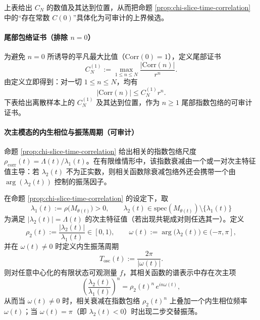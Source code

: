 
上表给出 $C_N$ 的数值及其达到位置，从而把命题 \ref{prop:chi-slice-time-correlation} 中的“存在常数 $C(0)$”具体化为可审计的上界候选。

\paragraph{尾部包络证书（排除 $n=0$）}
为避免 $n=0$ 所诱导的平凡最大比值（$\mathrm{Corr}(0)=1$），定义尾部证书
\[
C_N^{(1)}:=\max_{1\le n\le N}\frac{|\mathrm{Corr}(n)|}{r^n}.
\]
由定义立即得到：对一切 $1\le n\le N$，均有
\[
|\mathrm{Corr}(n)|\le C_N^{(1)} r^n.
\]
下表给出离散样本上的 $C_N^{(1)}$ 及其达到位置，作为 $n\ge 1$ 尾部指数包络的可审计证书。


\paragraph{次主模态的内生相位与振荡周期（可审计）}
命题 \ref{prop:chi-slice-time-correlation} 给出相关的指数包络尺度 $\rho_{\mathrm{corr}}(t)=\Lambda(t)/\lambda_1(t)$。在有限维情形中，该指数衰减由一个或一对次主特征值主导：若 $\lambda_2(t)$ 不为正实数，则相关函数除衰减包络外还会携带一个由 $\arg(\lambda_2(t))$ 控制的振荡因子。

\begin{remark}[次主相位与内生振荡周期]
\label{prop:chi-slice-subleading-phase}
在命题 \ref{prop:chi-slice-time-correlation} 的设定下，取
\[
\lambda_1(t):=\rho\bigl(M_{\theta(t)}\bigr)>0,
\qquad
\lambda_2(t)\in\mathrm{spec}(M_{\theta(t)})\setminus\{\lambda_1(t)\}
\]
为满足 $|\lambda_2(t)|=\Lambda(t)$ 的次主特征值（若出现共轭成对则任选其一）。定义
\[
\rho_2(t):=\frac{|\lambda_2(t)|}{\lambda_1(t)}\in[0,1),
\qquad
\omega(t):=\arg\bigl(\lambda_2(t)\bigr)\in(-\pi,\pi],
\]
并在 $\omega(t)\ne 0$ 时定义内生振荡周期
\[
T_{\mathrm{osc}}(t):=\frac{2\pi}{|\omega(t)|}.
\]
则对任意中心化的有限状态可观测量 $f$，其相关函数的谱表示中存在次主项
\[
\left(\frac{\lambda_2(t)}{\lambda_1(t)}\right)^n
=\rho_2(t)^n\,e^{i n\omega(t)},
\]
从而当 $\omega(t)\ne 0$ 时，相关衰减在指数包络 $\rho_2(t)^n$ 上叠加一个内生相位频率 $\omega(t)$；当 $\omega(t)=\pi$（即 $\lambda_2(t)<0$）时出现二步交替振荡。
\end{remark}




